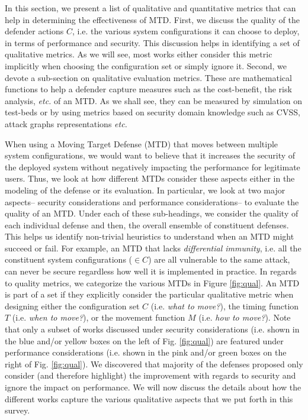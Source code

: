 \label{effect}
In this section, we present a list of qualitative and quantitative metrics that can help in determining the effectiveness of MTD. First, we discuss the quality of the defender actions $C$, i.e. the various system configurations it can choose to deploy, in terms of performance and security. This discussion helps in identifying a set of qualitative metrics. As we will see, most works either consider this metric implicitly when choosing the configuration set or simply ignore it.
Second, we devote a sub-section on qualitative evaluation metrics. These are mathematical functions to help a defender capture measures such as the cost-benefit, the risk analysis, {\em etc.} of an MTD. As we shall see, they can be measured by simulation on test-beds or by using metrics based on security domain knowledge such as CVSS, attack graphs representations {\em etc.}

When using a Moving Target Defense (MTD) that moves between multiple system configurations, we would want to believe that it increases the security of the deployed system without negatively impacting the performance for legitimate users. Thus, we look at how different MTDs consider these aspects either in the modeling of the defense or its evaluation. In particular, we look at two major aspects-- {security considerations} and {performance considerations}-- to evaluate the quality of an MTD. Under each of these sub-headings, we consider the quality of each individual defense and then, the {overall ensemble} of constituent defenses. This helps us identify {non-trivial heuristics} to understand when an MTD might succeed or fail. For example, an MTD that lacks {\em differential immunity}, i.e. all the constituent system configurations ($\in C$) are all vulnerable to the same attack, can never be secure regardless how well it is implemented in practice.
In regards to quality metrics, we categorize the various MTDs in Figure \ref{fig:qual}. An MTD is part of a set if they explicitly consider the particular qualitative metric when designing either the configuration set $C$ (i.e. {\em what to move?}), the timing function $T$ (i.e. {\em when to move?}), or the movement function $M$ (i.e. {\em how to move?}). Note that only a subset of works discussed under security considerations (i.e. shown in the {\color{CornflowerBlue!80!black} blue} and/or {\color{Goldenrod!90!black}yellow} boxes on the left of Fig. \ref{fig:qual}) are featured under {performance considerations} (i.e. shown in the {\color{Salmon!90!black} pink} and/or {\color{SpringGreen!90!black}green} boxes on the right of Fig. \ref{fig:qual}). We discovered that majority of the defenses proposed only consider (and therefore highlight) the improvement with regards to security and ignore the impact on performance. We will now discuss the details about how the different works capture the various qualitative aspects that we put forth in this survey.

